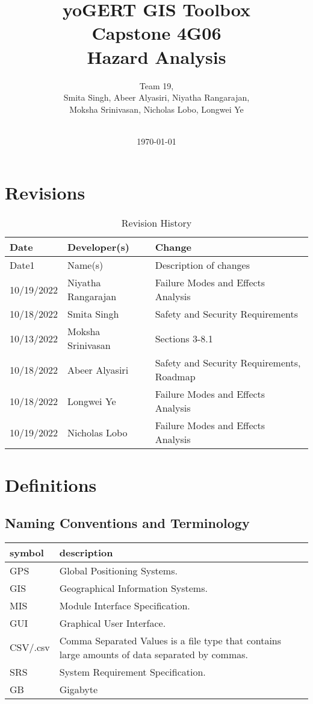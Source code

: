 \documentclass{article}
\title{\textbf{yoGERT GIS Toolbox}\\ Capstone 4G06\\ Hazard Analysis}
\author{Team 19,
		\\ Smita Singh, Abeer Alyasiri, Niyatha Rangarajan,\\ Moksha Srinivasan, Nicholas Lobo, Longwei Ye \\\\
}
\date{\today}
\begin{document}
\nocite{*}
\maketitle

\newpage

\tableofcontents
\listoftables
\listoffigures

\section{Revisions}

\begin{table}[hp]
\caption{Revision History} \label{TblRevisionHistory}
\begin{tabularx}{\textwidth}{llX}
\toprule
\textbf{Date} & \textbf{Developer(s)} & \textbf{Change}\\
\midrule
Date1 & Name(s) & Description of changes\\
10/19/2022 & Niyatha Rangarajan & Failure Modes and Effects Analysis\\
10/18/2022 & Smita Singh & Safety and Security Requirements\\
10/13/2022 & Moksha Srinivasan & Sections 3-8.1\\
10/18/2022 & Abeer Alyasiri & Safety and Security Requirements, Roadmap\\
10/18/2022 & Longwei Ye & Failure Modes and Effects Analysis\\
10/19/2022 & Nicholas Lobo & Failure Modes and Effects Analysis\\
\bottomrule
\end{tabularx}
\end{table}

\section{Definitions}
\subsection{Naming Conventions and Terminology}
\begin{tabular}{l p{6cm}} 
  \toprule		
  \textbf{symbol} & \textbf{description}\\
  \midrule 
  GPS & Global Positioning Systems.\\
  GIS & Geographical Information Systems.\\
  MIS & Module Interface Specification.\\
  GUI & Graphical User Interface. \\
  CSV/.csv & Comma Separated Values is a file type that contains large amounts of data separated by commas.\\
  SRS & System Requirement Specification.\\
  GB & Gigabyte \\

  \bottomrule
\end{tabular}\\
\end{document}
